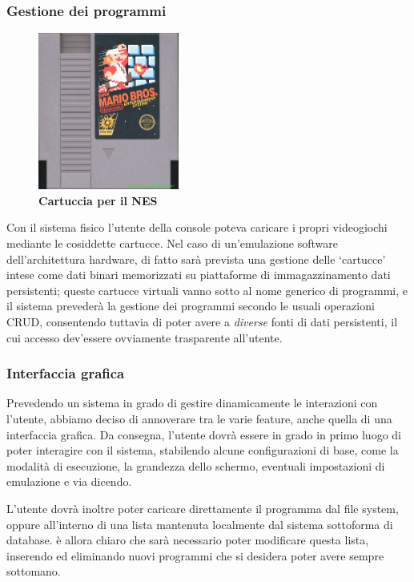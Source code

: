 \documentclass[11pt]{article}
\begin{document}
\subsubsection{Gestione dei programmi}
\begin{figure}[h]
\centering
\includegraphics[width=175px, height=195px]{MARIO_ROM.jpg}\\
\small\textbf{Cartuccia per il NES}
\end{figure}
Con il sistema fisico l'utente della console poteva caricare i propri videogiochi mediante le cosiddette cartucce. Nel caso di un'emulazione software dell'architettura hardware, di fatto sarà prevista una gestione delle `cartucce' intese come dati binari memorizzati su piattaforme di immagazzinamento dati persistenti; queste cartucce virtuali vanno sotto al nome generico di programmi, e il sistema prevederà la gestione dei programmi secondo le usuali operazioni CRUD, consentendo tuttavia di poter avere a \emph{diverse} fonti di dati persistenti, il cui accesso dev'essere ovviamente trasparente all'utente.

\subsubsection{Interfaccia grafica}

Prevedendo un sistema in grado di gestire dinamicamente le interazioni con l'utente, abbiamo deciso di annoverare tra le varie feature, anche quella di una interfaccia grafica. Da consegna, l'utente dovrà essere in grado in primo luogo di poter interagire con il sistema, stabilendo alcune configurazioni di base, come la modalità di esecuzione, la grandezza dello schermo, eventuali impostazioni di emulazione e via dicendo.

L'utente dovrà inoltre poter caricare direttamente il programma dal file system, oppure all'interno di una lista mantenuta localmente dal sistema sottoforma di database. è allora chiaro che sarà necessario poter modificare questa lista, inserendo ed eliminando nuovi programmi che si desidera poter avere sempre sottomano.
\end{document}
